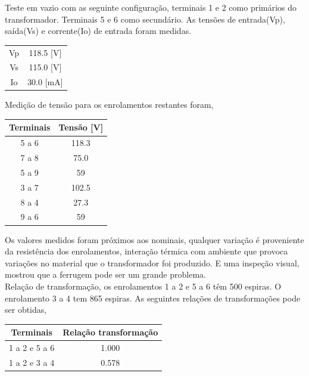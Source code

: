 \documentclass[conference]{IEEEtran}
\begin{document}
Teste em vazio com as seguinte configuração, terminais 1 e 2 como
primários do transformador. Terminais 5 e 6 como secundário.
As tensões de entrada(Vp), saída(Vs) e corrente(Io) de entrada foram medidas.

\begin{center}
    \begin{tabular}{|c||c|}
        \hline 
        Vp & 118.5 [V]\\
        Vs & 115.0 [V] \\
        Io & 30.0 [mA] \\
        \hline
    \end{tabular}
\end{center}

Medição de tensão para os enrolamentos restantes foram,

\begin{center}
    \begin{tabular}{|c||c|}
        \hline 
        Terminais & Tensão [V] \\
        \hline 
        5 a 6 & 118.3 \\
        7 a 8 & 75.0 \\
        5 a 9 & 59 \\
        3 a 7 & 102.5 \\
        8 a 4 & 27.3 \\
        9 a 6 & 59 \\
        \hline
    \end{tabular}
\end{center}

Os valores medidos foram próximos aos nominais, qualquer variação é 
proveniente da resistência dos enrolamentos, interação térmica com
ambiente que provoca variações no material que o transformador 
foi produzido. E uma inspeção visual, mostrou que a ferrugem pode
ser um grande problema. \\
Relação de transformação, os enrolamentos 1 a 2 e 5 a 6 têm 500 espiras.
O enrolamento 3 a 4 tem 865 espiras. As seguintes relações de transformações
pode ser obtidas,

\begin{center}
    \begin{tabular}{|c||c|}
        \hline 
        Terminais & Relação transformação \\
        \hline 
        1 a 2 e 5 a 6 & 1.000 \\
        1 a 2 e 3 a 4 & 0.578 \\
        \hline
    \end{tabular}
\end{center}
\end{document}
